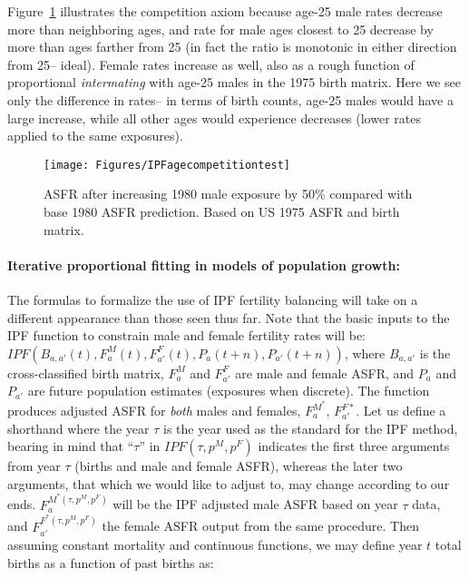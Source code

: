 Figure~\ref{fig:IPFcomp} illustrates the competition axiom because age-25 male
rates decrease more than neighboring ages, and rate for male ages closest to 25
decrease by more than ages farther from 25 (in fact the ratio is monotonic in
either direction from 25-- ideal). Female rates increase as well, also as a
rough function of proportional \textit{intermating} with age-25 males in the
1975 birth matrix. Here we see only the difference
in rates-- in terms of birth counts, age-25 males would have a large increase, while all other ages would experience decreases (lower rates applied to the same exposures).

\begin{figure}[ht!]
        \centering  
          \caption{ASFR after increasing 1980 male exposure by 50\% compared
          with base 1980 ASFR prediction. Based on US 1975 ASFR and birth
          matrix.}
           \texttt{[image: Figures/IPFagecompetitiontest]}
          \label{fig:IPFcomp}
\end{figure}

\paragraph{Iterative proportional fitting in models of population growth: }

The formulas to formalize the use of IPF fertility balancing will take on a
different appearance than those seen thus far. Note that the basic inputs to the
IPF function to constrain male and female fertility rates will be:
$IPF(B_{a,a'}(t), F_a^M(t), F_{a'}^F(t),P_a(t+n),P_{a'}(t+n))$, where $B_{a,a'}$
is the cross-classified birth matrix, $F_a^M$ and $F_{a'}^F$ are male and female ASFR,
and $P_a$ and $P_{a'}$ are future population estimates (exposures when
discrete). The function produces adjusted ASFR for \textit{both} males and females,
$F_a^{M^\ast}$, $F_{a'}^{F\ast}$. Let us define a shorthand where the year
$\tau$ is the year used as the standard for the IPF method, bearing in mind that
``$\tau$'' in $IPF(\tau, p^M, p^F)$ indicates the first three arguments from
year $\tau$ (births and male and female ASFR), whereas the later two arguments, that which we would like
to adjust to, may change according to our ends. $F_a^{M^\ast(\tau,p^M, p^F)}$
will be the IPF adjusted male ASFR based on year $\tau$ data, and
$F_{a'}^{F^\ast(\tau,p^M, p^F)}$ the female ASFR output from the same procedure.
Then assuming constant mortality and continuous functions, we may define year $t$ total births as a
function of past births as:

